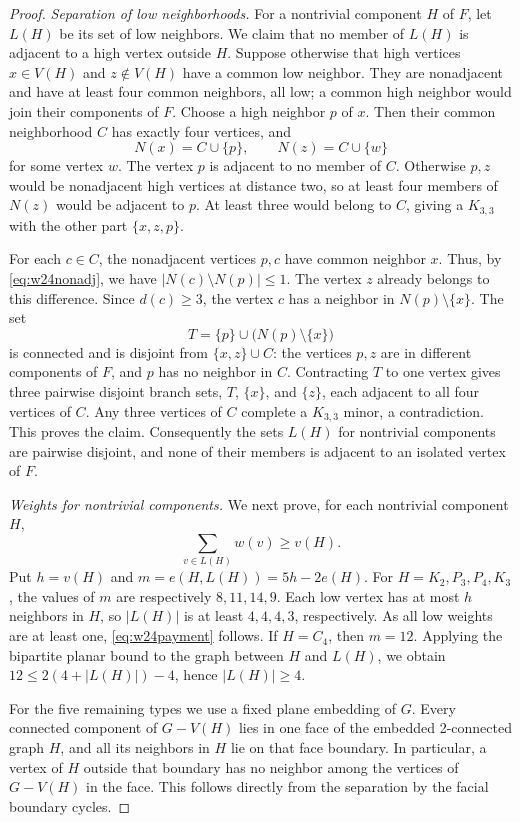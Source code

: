 \documentclass[11pt,a4paper]{article}
\theoremstyle{remark}
\begin{document}
\begin{proof}
\smallskip\noindent
\textit{Separation of low neighborhoods.}
For a nontrivial component $H$ of $F$, let $L(H)$ be its set of low
neighbors. We claim that no member of $L(H)$ is adjacent to a high
vertex outside $H$.
Suppose otherwise that high vertices $x\in V(H)$ and $z\notin V(H)$
have a common low neighbor. They are nonadjacent and have at least four
common neighbors, all low; a common high neighbor would join their
components of $F$. Choose a high neighbor $p$ of $x$. Then their common
neighborhood $C$ has exactly four vertices, and
\[
 N(x)=C\cup\{p\},\qquad N(z)=C\cup\{w\}
\]
for some vertex $w$. The vertex $p$ is adjacent to no member of $C$.
Otherwise $p,z$ would be nonadjacent high vertices at distance two, so
at least four members of $N(z)$ would be adjacent to $p$. At least three
would belong to $C$, giving a $K_{3,3}$ with the other part $\{x,z,p\}$.

For each $c\in C$, the nonadjacent vertices $p,c$ have common neighbor
$x$. Thus, by \eqref{eq:w24nonadj}, we have $|N(c)\setminus N(p)|\leq1$.
The vertex $z$ already belongs to this difference. Since $d(c)\geq3$,
the vertex $c$ has a neighbor in $N(p)\setminus\{x\}$.
The set
\[
 T=\{p\}\cup\bigl(N(p)\setminus\{x\}\bigr)
\]
is connected and is disjoint from $\{x,z\}\cup C$: the vertices $p,z$
are in different components of $F$, and $p$ has no neighbor in $C$.
Contracting $T$ to one vertex gives three pairwise disjoint branch sets,
$T$, $\{x\}$, and $\{z\}$, each adjacent to all four vertices of $C$.
Any three vertices of $C$ complete a $K_{3,3}$ minor, a contradiction.
This proves the claim. Consequently the sets $L(H)$ for nontrivial
components are pairwise disjoint, and none of their members is adjacent
to an isolated vertex of $F$.

\smallskip\noindent
\textit{Weights for nontrivial components.}
We next prove, for each nontrivial component $H$,
\begin{equation}\label{eq:w24payment}
 \sum_{v\in L(H)}w(v)\geq v(H).
\end{equation}
Put $h=v(H)$ and $m=e(H,L(H))=5h-2e(H)$. For
$H=K_2,P_3,P_4,K_3$, the values of $m$ are respectively $8,11,14,9$.
Each low vertex has at most $h$ neighbors in $H$, so $|L(H)|$ is at
least $4,4,4,3$, respectively. As all low weights are at least one,
\eqref{eq:w24payment} follows. If $H=C_4$, then $m=12$. Applying the
bipartite planar bound to the graph between $H$ and $L(H)$, we obtain
$12\leq2(4+|L(H)|)-4$, hence $|L(H)|\geq4$.

For the five remaining types we use a fixed plane embedding of $G$.
Every connected component of $G-V(H)$ lies in one face of the embedded
2-connected graph $H$, and all its neighbors in $H$ lie on that face
boundary. In particular, a vertex of $H$ outside that boundary has no
neighbor among the vertices of $G-V(H)$ in the face. This follows
directly from the separation by the facial boundary cycles.


\end{proof}
\end{document}
